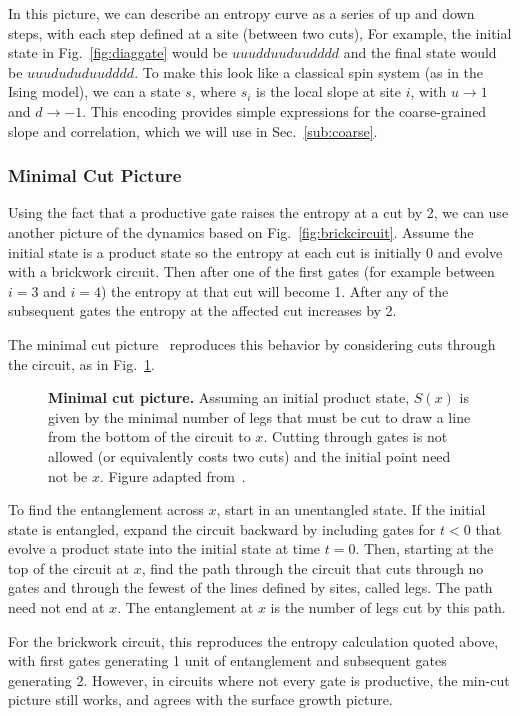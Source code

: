 In this picture, we can describe an entropy curve as a series of up and down steps, with each step defined at a site (between two cuts), For example, the initial state in Fig.~\ref{fig:diaggate} would be $uuudduuduudddd$ and the final state would be $uuudududuudddd$. To make this look like a classical spin system (as in the Ising model), we can a state $s$, where $s_i$ is the local slope at site $i$, with $u\to1$ and $d\to-1$. This encoding provides simple expressions for the coarse-grained slope and correlation, which we will use in Sec.~\ref{sub:coarse}.

\subsubsection{Minimal Cut Picture} \label{subsub:mincut}

Using the fact that a productive gate raises the entropy at a cut by 2, we can use another picture of the dynamics based on Fig.~\ref{fig:brickcircuit}. Assume the initial state is a product state so the entropy at each cut is initially 0 and evolve with a brickwork circuit. Then after one of the first gates (for example between $i=3$ and $i=4$) the entropy at that cut will become 1. After any of the subsequent gates the entropy at the affected cut increases by 2.

The minimal cut picture~\cite{Nahum2017} reproduces this behavior by considering cuts through the circuit, as in Fig.~\ref{fig:mincut}.
\begin{figure}
	\centering
	
	\caption{\textbf{Minimal cut picture.} Assuming an initial product state, $S(x)$ is given by the minimal number of legs that must be cut to draw a line from the bottom of the circuit to $x$. Cutting through gates is not allowed (or equivalently costs two cuts) and the initial point need not be $x$. Figure adapted from~\cite{Nahum2017}.}
	\label{fig:mincut}
\end{figure}
To find the entanglement across $x$, start in an unentangled state. If the initial state is entangled, expand the circuit backward by including gates for $t<0$ that evolve a product state into the initial state at time $t=0$. Then, starting at the top of the circuit at $x$, find the path through the circuit that cuts through no gates and through the fewest of the lines defined by sites, called legs. The path need not end at $x$. The entanglement at $x$ is the number of legs cut by this path. 

For the brickwork circuit, this reproduces the entropy calculation quoted above, with first gates generating 1 unit of entanglement and subsequent gates generating 2. However, in circuits where not every gate is productive, the min-cut picture still works, and agrees with the surface growth picture.

